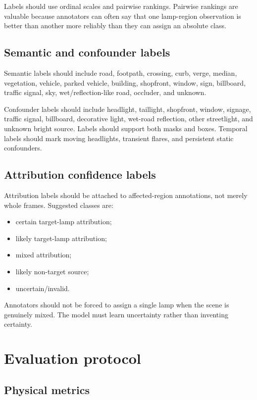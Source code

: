 \documentclass[11pt]{article}
\begin{document}
Labels should use ordinal scales and pairwise rankings. Pairwise rankings are valuable because annotators can often say that one lamp-region observation is better than another more reliably than they can assign an absolute class.

\subsection{Semantic and confounder labels}

Semantic labels should include road, footpath, crossing, curb, verge, median, vegetation, vehicle, parked vehicle, building, shopfront, window, sign, billboard, traffic signal, sky, wet/reflection-like road, occluder, and unknown.

Confounder labels should include headlight, taillight, shopfront, window, signage, traffic signal, billboard, decorative light, wet-road reflection, other streetlight, and unknown bright source. Labels should support both masks and boxes. Temporal labels should mark moving headlights, transient flares, and persistent static confounders.

\subsection{Attribution confidence labels}

Attribution labels should be attached to affected-region annotations, not merely whole frames. Suggested classes are:
\begin{itemize}
  \item certain target-lamp attribution;
  \item likely target-lamp attribution;
  \item mixed attribution;
  \item likely non-target source;
  \item uncertain/invalid.
\end{itemize}

Annotators should not be forced to assign a single lamp when the scene is genuinely mixed. The model must learn uncertainty rather than inventing certainty.

\section{Evaluation protocol}

\subsection{Physical metrics}
\end{document}
